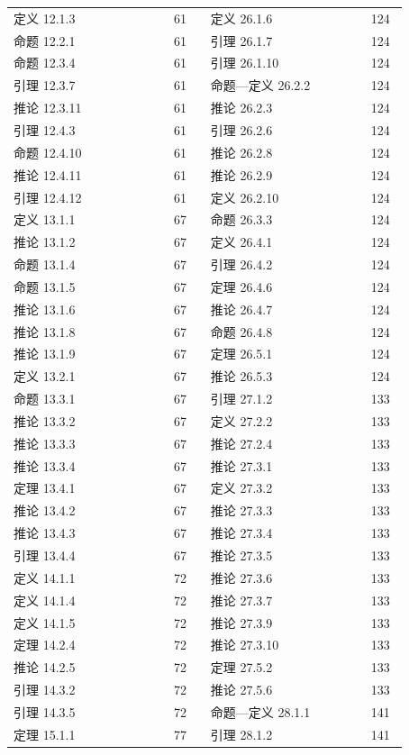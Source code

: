 \documentclass[UTF8,10pt,fontset=windows]{ctexart}
\begin{document}
{\begin{longtable}{@{}p{0.355\linewidth}p{0.085\linewidth}p{0.355\linewidth}p{0.085\linewidth}@{}}
定义 12.1.3 & 61 & 定义 26.1.6 & 124 \\
命题 12.2.1 & 61 & 引理 26.1.7 & 124 \\
命题 12.3.4 & 61 & 引理 26.1.10 & 124 \\
引理 12.3.7 & 61 & 命题—定义 26.2.2 & 124 \\
推论 12.3.11 & 61 & 推论 26.2.3 & 124 \\
引理 12.4.3 & 61 & 引理 26.2.6 & 124 \\
命题 12.4.10 & 61 & 推论 26.2.8 & 124 \\
推论 12.4.11 & 61 & 推论 26.2.9 & 124 \\
引理 12.4.12 & 61 & 定义 26.2.10 & 124 \\
定义 13.1.1 & 67 & 命题 26.3.3 & 124 \\
推论 13.1.2 & 67 & 定义 26.4.1 & 124 \\
命题 13.1.4 & 67 & 引理 26.4.2 & 124 \\
命题 13.1.5 & 67 & 定理 26.4.6 & 124 \\
推论 13.1.6 & 67 & 推论 26.4.7 & 124 \\
推论 13.1.8 & 67 & 命题 26.4.8 & 124 \\
推论 13.1.9 & 67 & 定理 26.5.1 & 124 \\
定义 13.2.1 & 67 & 推论 26.5.3 & 124 \\
命题 13.3.1 & 67 & 引理 27.1.2 & 133 \\
推论 13.3.2 & 67 & 定义 27.2.2 & 133 \\
推论 13.3.3 & 67 & 推论 27.2.4 & 133 \\
推论 13.3.4 & 67 & 推论 27.3.1 & 133 \\
定理 13.4.1 & 67 & 定义 27.3.2 & 133 \\
推论 13.4.2 & 67 & 推论 27.3.3 & 133 \\
推论 13.4.3 & 67 & 推论 27.3.4 & 133 \\
引理 13.4.4 & 67 & 推论 27.3.5 & 133 \\
定义 14.1.1 & 72 & 推论 27.3.6 & 133 \\
定义 14.1.4 & 72 & 推论 27.3.7 & 133 \\
定义 14.1.5 & 72 & 推论 27.3.9 & 133 \\
定理 14.2.4 & 72 & 推论 27.3.10 & 133 \\
推论 14.2.5 & 72 & 定理 27.5.2 & 133 \\
引理 14.3.2 & 72 & 推论 27.5.6 & 133 \\
引理 14.3.5 & 72 & 命题—定义 28.1.1 & 141 \\
定理 15.1.1 & 77 & 引理 28.1.2 & 141 \\

\end{longtable}}
\end{document}
